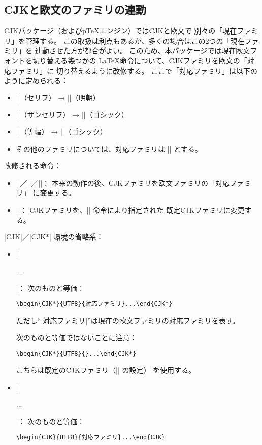 \documentclass[a4paper]{ltjsarticle}
\newcommand{\Pkg}[1]{\textsf{#1}}
\newcommand{\Means}{：\quad}
\newcommand{\Strong}{\textsf}
\providecommand{\pTeX}{p\TeX}
\begin{document}
\subsection{CJKと欧文のファミリの連動}
\label{ssec:sync-families}

\Pkg{CJK}パッケージ（および{\pTeX}エンジン）ではCJKと欧文で
別々の「現在ファミリ」を管理する。
この取扱は利点もあるが、多くの場合はこの2つの「現在ファミリ」を
連動させた方が都合がよい。
このため、本パッケージでは現在欧文フォントを切り替える幾つかの
{\LaTeX}命令について、CJKファミリを欧文の「対応ファミリ」に
切り替えるように改修する。
ここで「対応ファミリ」は以下のように定められる：

\begin{itemize}
\item |\rmfamily|（セリフ） → |\mcfamily|（明朝）
\item |\sffamily|（サンセリフ） → |\gtfamily|（ゴシック）
\item |\ttfamily|（等幅） → |\gtfamily|（ゴシック）
\item その他のファミリについては、対応ファミリは |\mcfamily| とする。
\end{itemize}

改修される命令：

\begin{itemize}
\item |\rmfamily|／|\sffamily|／|\ttfamily|\Means
  本来の動作の後、CJKファミリを欧文ファミリの「対応ファミリ」
  に変更する。
\item
  |\normalfont|\Means
  CJKファミリを、|\setCJKfamilydefault| 命令により指定された
  既定CJKファミリに変更する。
\end{itemize}

|CJK|／|CJK*| 環境の省略系\Means

\begin{itemize}
\item |\begin{uCJK*}...\end{uCJK*}|\Means
  次のものと等価\Means
\begin{verbatim}
\begin{CJK*}{UTF8}{対応ファミリ}...\end{CJK*}
\end{verbatim}
  ただし“|対応ファミリ|”は現在の欧文ファミリの対応ファミリを表す。

  次のものと等価では\Strong{ない}ことに注意\Means
\begin{verbatim}
\begin{CJK*}{UTF8}{}...\end{CJK*}
\end{verbatim}
  こちらは既定のCJKファミリ（|\setCJKfamilydefault| の設定）
  を使用する。

\item |\begin{uCJK}...\end{uCJK}|\Means
  次のものと等価\Means
\begin{verbatim}
\begin{CJK}{UTF8}{対応ファミリ}...\end{CJK}
\end{verbatim}
\end{itemize}
\end{document}
